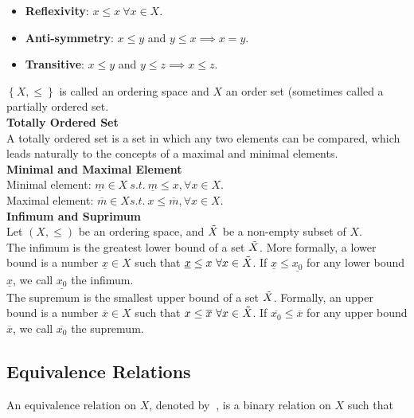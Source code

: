 \documentclass{article}
\numberwithin{theorem}{subsection}
\numberwithin{theorem}{subsubsection}
\numberwithin{lemma}{subsection}
\numberwithin{lemma}{subsubsection}
\theoremstyle{definition}
\numberwithin{definition}{subsection}
\numberwithin{definition}{subsubsection}
\begin{document}
\begin{itemize}
    \item \textbf{Reflexivity}: $x \leq x \ \forall x \in X$.
    \item \textbf{Anti-symmetry}: $x \leq y$ and $y \leq x \implies x = y$.
    \item \textbf{Transitive}: $x \leq y$ and $y \leq z \implies x \leq z$.
\end{itemize}

\noindent $\left \{ X, \leq \right \}$ is called an ordering space and $X$ an order set (sometimes called a partially ordered set. \\

\noindent \textbf{Totally Ordered Set}\\
\indent A totally ordered set is a set in which any two elements can be compared, which leads naturally to the concepts of a maximal and minimal elements. \\


\noindent \textbf{Minimal and Maximal Element}\\
\indent Minimal element: $\underline{m} \in X\ s.t.\ \underline{m} \leq x, \forall x \in X$.\\
\indent Maximal element: $\overline{m} \in X s.t.\ x \leq \overline{m}, \forall x \in X$.
\\

\noindent \textbf{Infimum and Suprimum}\\
\indent Let $(X, \leq)$ be an ordering space, and $\Tilde{X}$ be a non-empty subset of $X$. \\
\indent The infimum is the greatest lower bound of a set $\Tilde{X}$. More formally, a lower bound is a number $\underline{x} \in X$ such that $\underline{x} \leq x\  \forall x \in \Tilde{X}$. If $\underline{x} \leq \underline{x_{0}}$ for any lower bound $\underline{x}$, we call $\underline{x_{0}}$ the infimum. \\
\indent The supremum is the smallest upper bound of a set $\Tilde{X}$. Formally, an upper bound is a number $\overline{x} \in X$ such that $x \leq \overline{x}\ \forall x \in \Tilde{X}$. If $\overline{x_{0}} \leq \overline{x}$ for any upper bound $\overline{x}$, we call $\overline{x_0}$ the supremum.


\subsection{Equivalence Relations}
An equivalence relation on $X$, denoted by $~$, is a binary relation on $X$ such that
\end{document}
